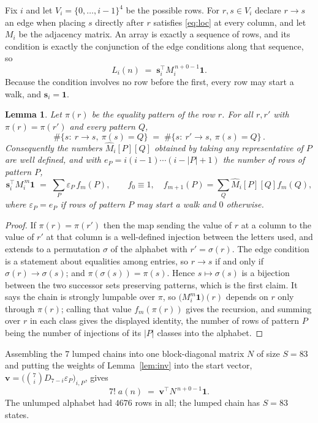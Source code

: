 \documentclass[11pt,a4paper]{article}
\theoremstyle{plain}
\newtheorem{lemma}[theorem]{Lemma}
\theoremstyle{definition}
\begin{document}
Fix $i$ and let $V_i=\{0,\dots,i-1\}^{4}$ be the possible rows. For $r,s\in V_i$
declare $r\to s$ an edge when placing $s$ directly after $r$ satisfies \eqref{eq:loc} at
every column, and let $M_i$ be the adjacency matrix. An array is exactly a sequence of
rows, and its condition is exactly the conjunction of the edge conditions along that
sequence, so
\[
L_i(n)\;=\;\mathbf{s}_i^{\!\top}M_i^{\,n+0-1}\mathbf{1} .
\]
Because the condition involves no row before the first, every
row may start a walk, and $\mathbf{s}_i=\mathbf{1}$.

\begin{lemma}\label{lem:lump}
Let $\pi(r)$ be the equality pattern of the row $r$. For all $r,r'$ with
$\pi(r)=\pi(r')$ and every pattern $Q$,
\[
\#\{s:\ r\to s,\ \pi(s)=Q\}\;=\;\#\{s:\ r'\to s,\ \pi(s)=Q\}\, .
\]
Consequently the numbers $\widehat M_i[P][Q]$ obtained by taking any representative of $P$
are well defined, and with $e_P=i(i-1)\cdots(i-|P|+1)$ the number of rows of pattern $P$,
\[
\mathbf{s}_i^{\!\top}M_i^{\,m}\mathbf{1}\;=\;\sum_P \varepsilon_P\,f_m(P),
\qquad f_0\equiv1,\quad f_{m+1}(P)=\sum_Q\widehat M_i[P][Q]f_m(Q),
\]
where $\varepsilon_P=e_P$ if rows of pattern $P$ may start a walk and $0$ otherwise.
\end{lemma}

\begin{proof}
If $\pi(r)=\pi(r')$ then the map sending the value of $r$ at a column to the value of $r'$
at that column is a well-defined injection between the letters used, and extends to a
permutation $\sigma$ of the alphabet with $r'=\sigma(r)$. The edge condition is a statement
about equalities among entries, so $r\to s$ if and only if $\sigma(r)\to\sigma(s)$; and
$\pi(\sigma(s))=\pi(s)$. Hence $s\mapsto\sigma(s)$ is a bijection between the two successor
sets preserving patterns, which is the first claim. It says the chain is strongly lumpable
over $\pi$, so $\bigl(M_i^{m}\mathbf{1}\bigr)(r)$ depends on $r$ only through $\pi(r)$;
calling that value $f_m(\pi(r))$ gives the recursion, and summing over $r$ in each class
gives the displayed identity, the number of rows of pattern $P$ being the number of
injections of its $|P|$ classes into the alphabet.
\end{proof}

Assembling the $7$ lumped chains into one block-diagonal matrix $N$ of size $S=83$ and
putting the weights of Lemma~\ref{lem:inv} into the start vector,
$\mathbf{v}=\bigl(\binom{7}{i}D_{7-i}\varepsilon_P\bigr)_{i,P}$, gives
\begin{equation}\label{eq:walk}
7!\;a(n)\;=\;\mathbf{v}^{\!\top}N^{\,n+0-1}\mathbf{1} .
\end{equation}
The unlumped alphabet had $4676$ rows in all; the lumped chain has $S=83$ states.
\end{document}
